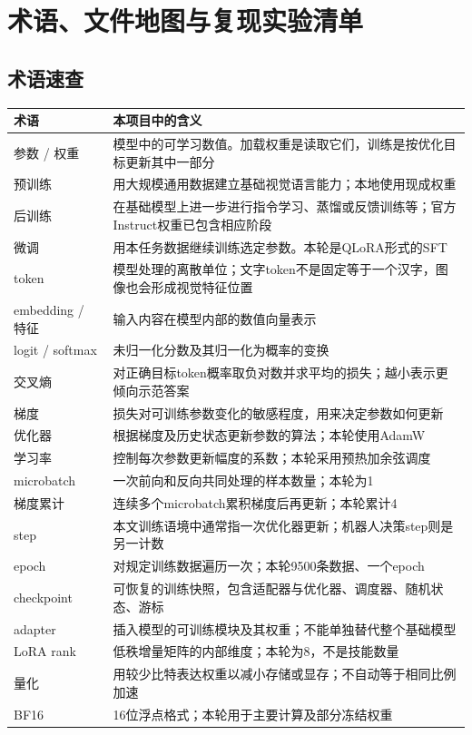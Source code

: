 \chapter{术语、文件地图与复现实验清单}
\section{术语速查}
\begin{longtable}{P{33mm}P{119mm}}
\toprule
术语 & 本项目中的含义\\
\midrule
\endhead
参数 / 权重 & 模型中的可学习数值。加载权重是读取它们，训练是按优化目标更新其中一部分\\
预训练 & 用大规模通用数据建立基础视觉语言能力；本地使用现成权重\\
后训练 & 在基础模型上进一步进行指令学习、蒸馏或反馈训练等；官方Instruct权重已包含相应阶段\\
微调 & 用本任务数据继续训练选定参数。本轮是QLoRA形式的SFT\\
token & 模型处理的离散单位；文字token不是固定等于一个汉字，图像也会形成视觉特征位置\\
embedding / 特征 & 输入内容在模型内部的数值向量表示\\
logit / softmax & 未归一化分数及其归一化为概率的变换\\
交叉熵 & 对正确目标token概率取负对数并求平均的损失；越小表示更倾向示范答案\\
梯度 & 损失对可训练参数变化的敏感程度，用来决定参数如何更新\\
优化器 & 根据梯度及历史状态更新参数的算法；本轮使用AdamW\\
学习率 & 控制每次参数更新幅度的系数；本轮采用预热加余弦调度\\
microbatch & 一次前向和反向共同处理的样本数量；本轮为1\\
梯度累计 & 连续多个microbatch累积梯度后再更新；本轮累计4\\
step & 本文训练语境中通常指一次优化器更新；机器人决策step则是另一计数\\
epoch & 对规定训练数据遍历一次；本轮9500条数据、一个epoch\\
checkpoint & 可恢复的训练快照，包含适配器与优化器、调度器、随机状态、游标\\
adapter & 插入模型的可训练模块及其权重；不能单独替代整个基础模型\\
LoRA rank & 低秩增量矩阵的内部维度；本轮为8，不是技能数量\\
量化 & 用较少比特表达权重以减小存储或显存；不自动等于相同比例加速\\
BF16 & 16位浮点格式；本轮用于主要计算及部分冻结权重\\

\end{longtable}
